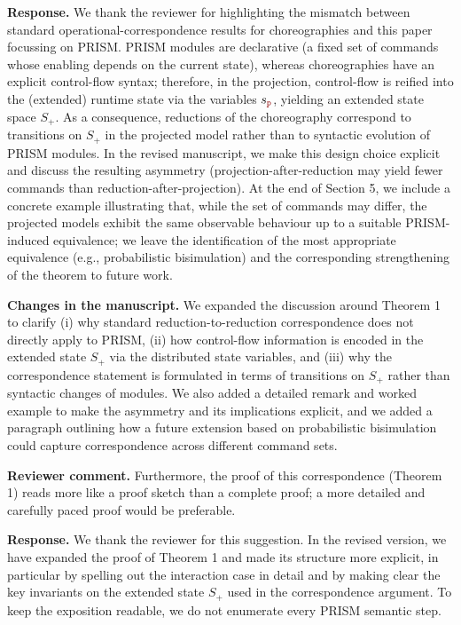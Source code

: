 \documentclass[11pt]{article}
\newcommand{\role}[1]{\textcolor{bloodyred}{\mathtt{#1}}}
\newcommand{\nr}{\role p}
\newcommand{\revcomment}[1]{%
  \begin{reviewercomment}
  \textbf{Reviewer comment.} #1
  \end{reviewercomment}
}
\newcommand{\revresponse}[2][]{%
  \par\noindent\textbf{Response.} #1 #2
}
\newcommand{\revchanges}[2][]{%
  \par\noindent\textbf{Changes in the manuscript.} #1
  #2\par\bigskip
}
\begin{document}
\revresponse{ We thank the reviewer for highlighting the mismatch
  between standard operational-correspondence results for
  choreographies and this paper focussing on PRISM.  PRISM modules are
  declarative (a fixed set of commands whose enabling depends on the
  current state), whereas choreographies have an explicit control-flow
  syntax; therefore, in the projection, control-flow is reified into
  the (extended) runtime state via the variables $s_{\nr}$, yielding
  an extended state space $S_+$. As a consequence, reductions of the
  choreography correspond to transitions on $S_+$ in the projected
  model rather than to syntactic evolution of PRISM modules.
%
  In the revised manuscript, we make this design choice explicit and
  discuss the resulting asymmetry (projection-after-reduction may
  yield fewer commands than reduction-after-projection). At the end of
  Section 5, we include a concrete example illustrating that, while
  the set of commands may differ, the projected models exhibit the
  same observable behaviour up to a suitable PRISM-induced
  equivalence; we leave the identification of the most appropriate
  equivalence (e.g., probabilistic bisimulation) and the corresponding
  strengthening of the theorem to future work.  }

\revchanges{ We expanded the discussion around Theorem 1 to clarify
  (i) why standard reduction-to-reduction correspondence does not
  directly apply to PRISM, (ii) how control-flow information is
  encoded in the extended state $S_+$ via the distributed state
  variables, and (iii) why the correspondence statement is formulated
  in terms of transitions on $S_+$ rather than syntactic changes of
  modules. We also added a detailed remark and worked example to make
  the asymmetry and its implications explicit, and we added a
  paragraph outlining how a future extension based on probabilistic
  bisimulation could capture correspondence across different command
  sets.  }

\revcomment{ Furthermore, the proof of this correspondence (Theorem 1)
  reads more like a proof sketch than a complete proof; a more
  detailed and carefully paced proof would be preferable.  }

\revresponse{ We thank the reviewer for this suggestion. In the
  revised version, we have expanded the proof of Theorem 1 and made
  its structure more explicit, in particular by spelling out the
  interaction case in detail and by making clear the key invariants on
  the extended state $S_+$ used in the correspondence argument. To
  keep the exposition readable, we do not enumerate every PRISM
  semantic step.  }
\end{document}
